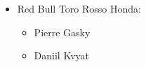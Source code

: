 \documentclass{report}
\begin{document}
\begin{itemize}
\begin{itemize}
\begin{figure}[!h]
\begin{floatrow}
            \end{floatrow}
        \end{figure}
        \end{itemize} \hfill\break
    \item Red Bull Toro Rosso Honda:
        \begin{itemize}
            \item Pierre Gasky
            \item Daniil Kvyat \hfill\break
        \begin{figure}[!h]
            \begin{floatrow}

\end{floatrow}
\end{figure}
\end{itemize}
\end{itemize}
\end{document}

